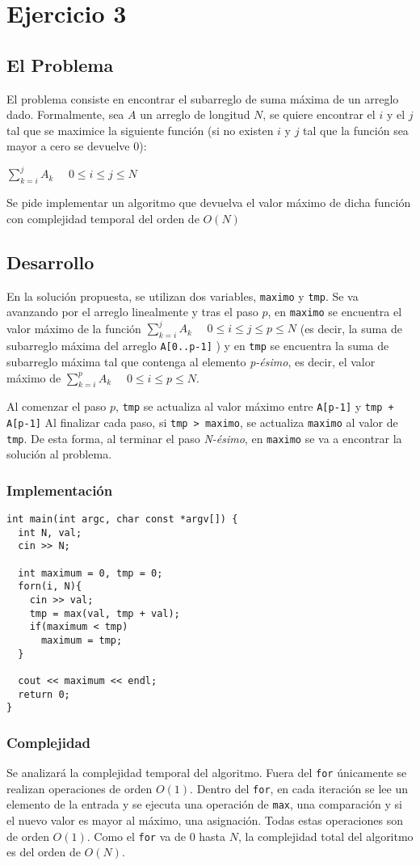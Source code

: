 \section{Ejercicio 3}
\subsection{El Problema}
El problema consiste en encontrar el subarreglo de suma máxima de un arreglo dado. Formalmente, sea $A$ un arreglo de longitud $N$, se quiere encontrar el $i$ y el $j$ tal que se maximice la siguiente función (si no existen $i$ y $j$ tal que la función sea mayor a cero se devuelve 0): 
\begin{center} $\sum_{k=i}^{j} A_k$            $ \quad 0\leq i\leq j\leq N$
\end{center}
Se pide implementar un algoritmo que devuelva el valor máximo de dicha función con complejidad temporal del orden de $O(N)$
\subsection{Desarrollo}
En la solución propuesta, se utilizan dos variables, \texttt{maximo} y \texttt{tmp}. Se va avanzando por el arreglo linealmente y tras el paso $p$, en  \texttt{maximo} se encuentra el valor máximo de la función $\sum_{k=i}^{j} A_k$            $ \quad 0\leq i\leq j\leq p \leq N$ (es decir, la suma de subarreglo máxima del arreglo  \texttt{A[0..p-1]} ) y en  \texttt{tmp} se encuentra la suma de subarreglo máxima tal que contenga al elemento \emph{p-ésimo}, es decir, el valor máximo de  $\sum_{k=i}^{p} A_k$            $ \quad 0\leq i\leq p\leq N$.


Al comenzar el paso $p$,  \texttt{tmp} se actualiza al valor máximo entre  \texttt{A[p-1]} y  \texttt{tmp + A[p-1]}
Al finalizar cada paso, si  \texttt{tmp > maximo}, se actualiza  \texttt{maximo} al valor de  \texttt{tmp}.
De esta forma, al terminar el paso \emph{N-ésimo}, en \texttt{maximo} se va a encontrar la solución al problema.
\subsubsection{Implementación}
\begin{verbatim}
int main(int argc, char const *argv[]) {
  int N, val;
  cin >> N;

  int maximum = 0, tmp = 0;
  forn(i, N){
    cin >> val;
    tmp = max(val, tmp + val);
    if(maximum < tmp)
      maximum = tmp;
  }

  cout << maximum << endl;
  return 0;
}
\end{verbatim}
\subsubsection{Complejidad}
Se analizará la complejidad temporal del algoritmo.
Fuera del \texttt{for} únicamente se realizan operaciones de orden $O(1)$. Dentro del \texttt{for}, en cada iteración se lee un elemento de la entrada y se ejecuta una operación de \texttt{max}, una comparación y si el nuevo valor es mayor al máximo, una asignación. Todas estas operaciones son de orden $O(1)$.
Como el \texttt{for} va de $0$ hasta $N$, la complejidad total del algoritmo es del orden de $O(N)$.